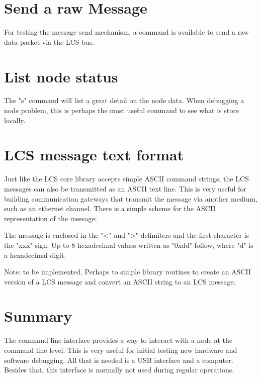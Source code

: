 
\section{Send a raw Message}

For testing the message send mechanism, a command is available to send a raw data packet via the LCS bus.


\section{List node status}

The "s" command will list a great detail on the node data. When debugging a node problem, this is perhaps the most useful command to see what is store locally.



\section{LCS message text format}

Just like the LCS core library accepts simple ASCII command strings, the LCS messages can also be transmitted as an ASCII text line. This is very useful for building communication gateways that transmit the message via another medium, such as an ethernet channel. There is a simple scheme for the ASCII representation of the message:

%

The message is enclosed in the "<" and ">" delimiters and the first character is the "xxx" sign. Up to 8 hexadecimal values written as "0xdd" follow, where "d" is a hexadecimal digit.



Note: to be implemented. Perhaps to simple library routines to create an ASCII version of a LCS message and convert an ASCII string to an LCS message.

\section{Summary}

The command line interface provides a way to interact with a node at the command line level. This is very useful for initial testing new hardware and software debugging. All that is needed is a USB interface and a computer. Besides that, this interface is normally not used during regular operations.
